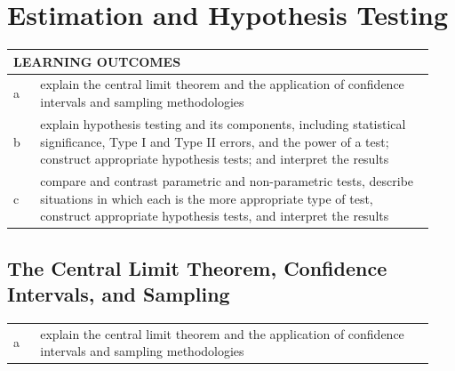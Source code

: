 \chapter{Estimation and Hypothesis Testing}
\label{chap:Estimation and Hypothesis Testing}
\begin{center}
\begin{tabular}{p{0.06\linewidth} | p{0.88\linewidth}}
	\toprule
	\multicolumn{2}{l}{\textbf{LEARNING OUTCOMES}} \\
	\midrule
	a & explain the central limit theorem and the application of confidence intervals and sampling methodologies \\
	\midrule
	b & explain hypothesis testing and its components, including statistical significance, Type I and Type II errors, and the power of a test; construct appropriate hypothesis tests; and interpret the results \\
	\midrule
	c & compare and contrast parametric and non-parametric tests, describe situations in which each is the more appropriate type of test, construct appropriate hypothesis tests, and interpret the results \\
	\bottomrule
\end{tabular}
\end{center}
\vspace{1.5em}
\section{The Central Limit Theorem, Confidence Intervals, and Sampling}
\label{sec:The Central Limit Theorem, Confidence Intervals, and Sampling}
\begin{center}
\begin{tabular}{p{0.06\linewidth} | p{0.88\linewidth}}
	a & explain the central limit theorem and the application of confidence intervals and sampling methodologies \\
\end{tabular}
\end{center}
